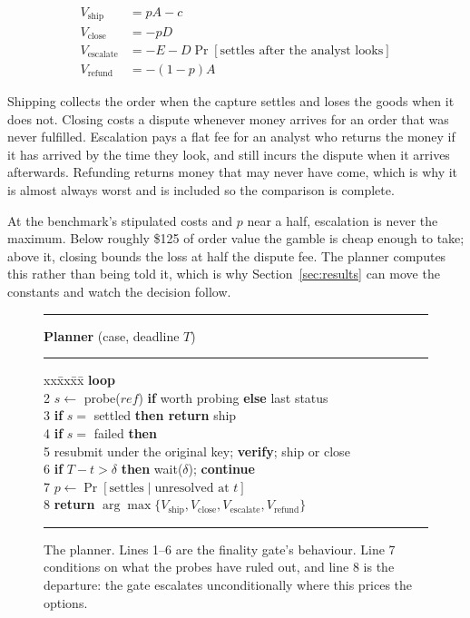 \documentclass[conference]{IEEEtran}
\begin{document}
\begin{align}
V_{\text{ship}}     &= pA - c \\
V_{\text{close}}    &= -pD \\
V_{\text{escalate}} &= -E - D \Pr[\text{settles after the analyst looks}] \\
V_{\text{refund}}   &= -(1-p)A
\end{align}

Shipping collects the order when the capture settles and loses the goods when it
does not. Closing costs a dispute whenever money arrives for an order that was
never fulfilled. Escalation pays a flat fee for an analyst who returns the money
if it has arrived by the time they look, and still incurs the dispute when it
arrives afterwards. Refunding returns money that may never have come, which is
why it is almost always worst and is included so the comparison is complete.

At the benchmark's stipulated costs and $p$ near a half, escalation is never the
maximum. Below roughly \$125 of order value the gamble is cheap enough to take;
above it, closing bounds the loss at half the dispute fee. The planner computes
this rather than being told it, which is why Section~\ref{sec:results} can move
the constants and watch the decision follow.

\begin{figure}[t]
\small
\hrule\vspace{2pt}
\textbf{Planner}\; (case, deadline $T$)
\vspace{2pt}\hrule\vspace{3pt}
\begin{tabbing}
xx\=xx\=xx\=\> \textbf{loop} \\
2\> \> $s \gets$ probe($\mathit{ref}$) \textbf{if} worth probing \textbf{else} last status \\
3\> \> \textbf{if} $s =$ settled \textbf{then return} ship \\
4\> \> \textbf{if} $s =$ failed \textbf{then} \\
5\> \> \> resubmit under the original key; \textbf{verify}; ship or close \\
6\> \> \textbf{if} $T - t > \delta$ \textbf{then} wait($\delta$); \textbf{continue} \\
7\> \> $p \gets \Pr[\text{settles} \mid \text{unresolved at } t]$ \\
8\> \> \textbf{return} $\arg\max \{V_{\text{ship}}, V_{\text{close}},
        V_{\text{escalate}}, V_{\text{refund}}\}$
\end{tabbing}
\vspace{-4pt}\hrule
\caption{The planner. Lines 1--6 are the finality gate's behaviour. Line 7
conditions on what the probes have ruled out, and line 8 is the departure: the
gate escalates unconditionally where this prices the options.}
\label{fig:algorithm}
\end{figure}
\end{document}
